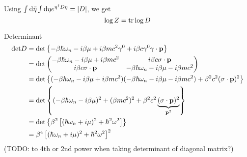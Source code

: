 Using $\int \mathop{}\!\mathrm{d} \bar\eta \int \mathop{}\!\mathrm{d} \eta e^{\eta^\dagger D \eta} = \lvert D \rvert$, we get
\begin{equation}
	\log Z = \text{tr} \log{D}
\end{equation}

Determinant
\begin{equation}
\begin{split}
	\text{det} D  & = \text{det} \left\{ -\beta \hbar \omega_n - i \beta \mu + i \beta m c^2 \gamma^0 + i \beta c \gamma^0 \mathbf{\gamma} \cdot \mathbf{p} \right\} \\
	         & = \text{det} \begin{pmatrix} 
	                 -\beta \hbar \omega_n - i \beta \mu + i \beta m c^2           & i \beta c \mathbf{\sigma} \cdot \mathbf{p}                \\ 
	                 i \beta c \mathbf{\sigma} \cdot \mathbf{p}                          & -\beta \hbar \omega_n - i \beta \mu - i \beta m c^2 \\ 
	             \end{pmatrix} \\
	         & = \text{det} \left\{ (-\beta \hbar \omega_n - i \beta \mu + i \beta mc^2) (-\beta \hbar \omega_n - i \beta \mu - i \beta m c^2) + \beta^2 c^2 (\mathbf{\sigma} \cdot \mathbf{p})^2 \right\} \\
	         & = \text{det} \left\{ (-\beta \hbar \omega_n - i \beta \mu)^2 + (\beta m c^2)^2 + \beta^2 c^2 \underbrace{(\mathbf{\sigma} \cdot \mathbf{p})^2}_{\mathbf{p}^2} \right\} \\
	         & = \text{det} \left\{ \beta^2 \left[ (\hbar \omega_n + i \mu)^2 + \hbar^2 \omega^2 \right] \right\} \\
	         & = \beta^4 \left[ (\hbar \omega_n + i \mu)^2 + \hbar^2 \omega^2 \right]^2
\end{split}
\end{equation}
(TODO: to 4th or 2nd power when taking determinant of diagonal matrix?)

